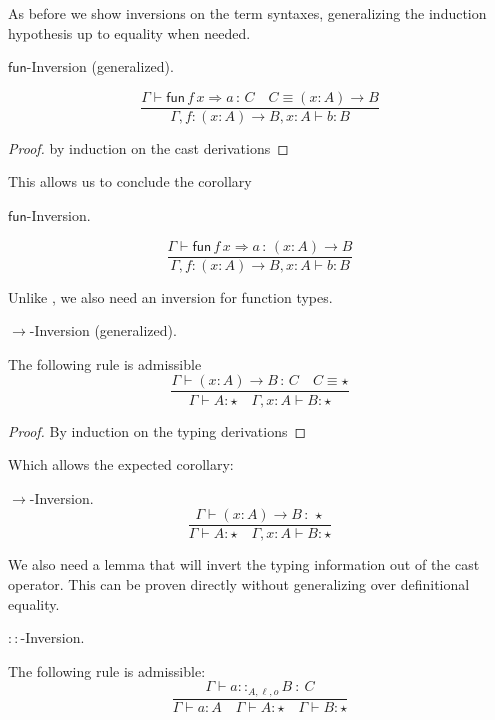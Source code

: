 As before we show inversions on the term syntaxes, generalizing the induction hypothesis up to equality when needed.

\begin{lem} $\mathsf{fun}$-Inversion (generalized).
 
\[
\frac{\Gamma \vdash\mathsf{fun}\,f\,x\Rightarrow a\,:\,C\quad C\equiv\left(x:A\right)\rightarrow B}{\Gamma, f:\left(x:A\right)\rightarrow B,x:A\vdash b:B}
\]
\end{lem}
\begin{proof}
by induction on the cast derivations
\end{proof}
 
This allows us to conclude the corollary

\begin{cor} $\mathsf{fun}$-Inversion.
 
\[
\frac{\Gamma \vdash\mathsf{fun}\,f\,x\Rightarrow a\,:\,\left(x:A\right)\rightarrow B}{\Gamma, f:\left(x:A\right)\rightarrow B,x:A\vdash b:B}
\]
\end{cor}

Unlike , we also need an inversion for function types.

\begin{lem} $\rightarrow$-Inversion (generalized).
 
The following rule is admissible
\[
\frac{\Gamma \vdash\left(x:A\right)\rightarrow B\,:\,C\quad C\equiv\star}{\Gamma \vdash A:\star\quad \Gamma, x:A \vdash B:\star}
\]
\end{lem}
\begin{proof}
By induction on the typing derivations
\end{proof}

Which allows the expected corollary:

\begin{cor} $\rightarrow$-Inversion.
\[
\frac{\Gamma \vdash\left(x:A\right)\rightarrow B\,:\,\star}{\Gamma \vdash A:\star\quad \Gamma, x:A\vdash B:\star}
\]
\end{cor}
 
We also need a lemma that will invert the typing information out of the cast operator.
This can be proven directly without generalizing over definitional equality.
 
\begin{lem} $::$-Inversion.
 
The following rule is admissible:
\[
\frac{\Gamma \vdash a::_{A,\ell ,o}B\::\:C}{\Gamma \vdash a:A\quad \Gamma \vdash A:\star\quad \Gamma \vdash B:\star}
\]
\end{lem}
 
